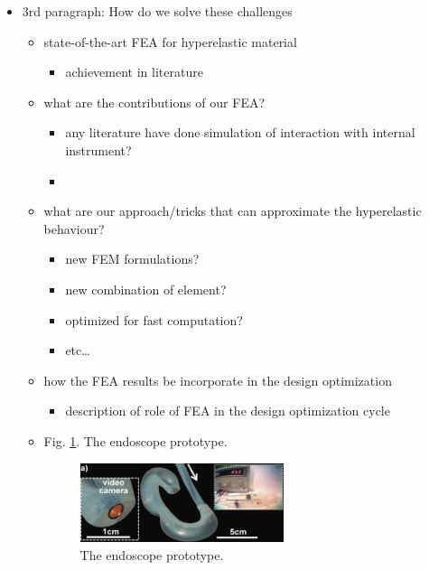 \documentclass[journal,onecolumn]{IEEEtran}
\begin{document}
\begin{itemize}
\item 3rd paragraph: How do we solve these challenges
\begin{itemize}
\item state-of-the-art FEA for hyperelastic material
\begin{itemize}
\item achievement in literature
\end{itemize}
\item what are the contributions of our FEA?
\begin{itemize}
\item any literature have done simulation of interaction with internal instrument?
\item 
\end{itemize}
\item what are our approach/tricks that can approximate the hyperelastic behaviour?
\begin{itemize}
\item new FEM formulations?
\item new combination of element?
\item optimized for fast computation?
\item etc\ldots{}
\end{itemize}

\item how the FEA results be incorporate in the design optimization
\begin{itemize}
\item description of role of FEA in the design optimization cycle
\end{itemize}

\item Fig. \ref{fig:orgfa82c82}. The endoscope prototype.

\begin{figure}[!h]
\centering
\includegraphics[width=0.6\textwidth]{./fig/fig-robot_intro.png}
\caption{\label{fig:orgfa82c82}
The endoscope prototype.}
\end{figure}


\end{itemize}
\end{itemize}
\end{document}
